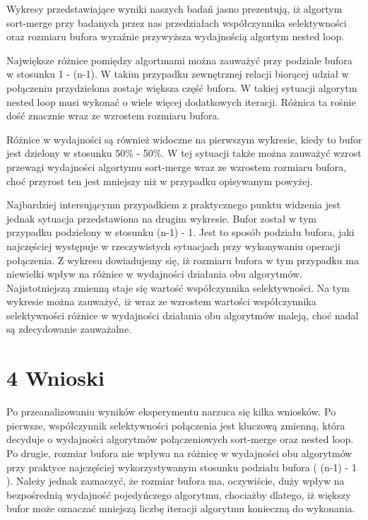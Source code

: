 \documentclass[]{article}
\begin{document}
Wykresy przedstawiające wyniki naszych badań jasno prezentują, iż
algortym sort-merge przy badanych przez nas przedziałach współczynnika
selektywności oraz rozmiaru bufora wyraźnie przywyższa wydajnością
algortym nested loop. \vspace{2mm}

Największe różnice pomiędzy algortmami można zauważyć przy podziale
bufora w stosunku 1 - (n-1). W takim przypadku zewnętrznej relacji
biorącej udział w połączeniu przydzielona zostaje większa część bufora.
W takiej sytuacji algorytm nested loop musi wykonać o wiele więcej
dodatkowych iteracji. Różnica ta rośnie dość znacznie wraz ze wzrostem
rozmiaru bufora. \vspace{2mm}

Różnice w wydajności są również widoczne na pierwszym wykresie, kiedy to
bufor jest dzielony w stosunku 50\% - 50\%. W tej sytuacji także można
zauważyć wzrost przewagi wydajności algortymu sort-merge wraz ze
wzrostem rozmiaru bufora, choć przyrost ten jest mniejszy niż w
przypadku opisywanym powyżej. \vspace{2mm}

Najbardziej intersującymn przypadkiem z praktycznego punktu widzenia
jest jednak sytuacja przedstawiona na drugim wykresie. Bufor został w
tym przypadku podzielony w stosunku (n-1) - 1. Jest to sposób podziału
bufora, jaki najczęściej występuje w rzeczywistych sytuacjach przy
wykonywaniu operacji połączenia. Z wykresu dowiadujemy się, iż rozmiaru
bufora w tym przypadku ma niewielki wpływ na różnice w wydajności
działania obu algorytmów. Najistotniejszą zmienną staje się wartość
współczynnika selektywności. Na tym wykresie można zauważyć, iż wraz ze
wzrostem wartości współczynnika selektywności różnice w wydajności
działania obu algorytmów maleją, choć nadal są zdecydowanie zauważalne.
\vspace{2mm}

\section{4 Wnioski}\label{wnioski}

Po przeanalizowaniu wyników eksperymentu narzuca się kilka wniosków. Po
pierwsze, współczynnik selektywności połączenia jest kluczową zmienną,
która decyduje o wydajności algorytmów połączeniowych sort-merge oraz
nested loop. Po drugie, rozmiar bufora nie wpływa na różnicę w
wydajności obu algorytmów przy praktyce najczęściej wykorzystywanym
stosunku podziału bufora ( (n-1) - 1 ). Należy jednak zaznaczyć, że
rozmiar bufora ma, oczywiście, duży wpływ na bezpośrednią wydajność
pojedyńczego algorytmu, chociażby dlatego, iż większy bufor może
oznaczać mniejszą liczbę iteracji algorytmu konieczną do wykonania.
\vspace{2mm}
\end{document}
